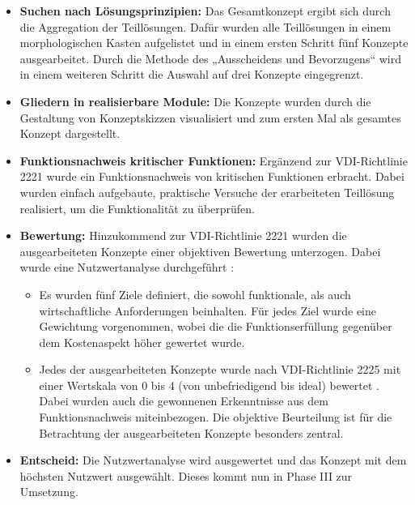 \begin{itemize}
	\item \textbf{Suchen nach Lösungsprinzipien:} Das Gesamtkonzept ergibt sich durch die Aggregation der Teillösungen. Dafür wurden alle Teillösungen in einem morphologischen Kasten aufgelistet und in einem ersten Schritt fünf Konzepte ausgearbeitet. Durch die Methode des „Ausscheidens und Bevorzugens“ \cite{naefe} wird in einem weiteren Schritt die Auswahl auf drei Konzepte eingegrenzt.
	
	\item \textbf{Gliedern in realisierbare Module:} Die Konzepte wurden durch die Gestaltung von Konzeptskizzen visualisiert und zum ersten Mal als gesamtes Konzept dargestellt. 
	
	\item \textbf{Funktionsnachweis kritischer Funktionen:} Ergänzend zur VDI-Richtlinie 2221 wurde ein Funktionsnachweis von kritischen Funktionen erbracht. Dabei wurden einfach aufgebaute, praktische Versuche der erarbeiteten Teillösung realisiert, um die Funktionalität zu überprüfen.
	
	\item \textbf{Bewertung:} Hinzukommend zur VDI-Richtlinie 2221 wurden die ausgearbeiteten Konzepte einer objektiven Bewertung unterzogen. Dabei wurde eine Nutzwertanalyse durchgeführt \cite{pahl}:
	\begin{itemize}
		\item Es wurden fünf Ziele definiert, die sowohl funktionale, als auch wirtschaftliche Anforderungen beinhalten. Für jedes Ziel wurde eine Gewichtung vorgenommen, wobei die die Funktionserfüllung gegenüber dem Kostenaspekt höher gewertet wurde.
		
		\item Jedes der ausgearbeiteten Konzepte wurde nach VDI-Richtlinie 2225 mit einer Wertskala von 0 bis 4 (von unbefriedigend bis ideal) bewertet \cite{vdi2225}. Dabei wurden auch die gewonnenen Erkenntnisse aus dem Funktionsnachweis miteinbezogen. Die objektive Beurteilung ist für die Betrachtung der ausgearbeiteten Konzepte besonders zentral.
	\end{itemize}	
	
	\item \textbf{Entscheid:} Die Nutzwertanalyse wird ausgewertet und das Konzept mit dem höchsten Nutzwert ausgewählt. Dieses kommt nun in Phase III zur Umsetzung. 
\end{itemize}

